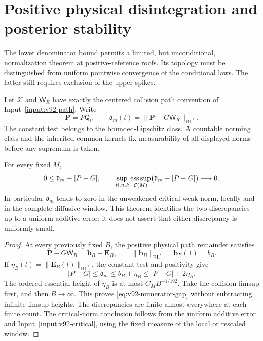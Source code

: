 \section{Positive physical disintegration and posterior stability}
\label{sec:v92-paths}
The lower denominator bound permits a limited, but unconditional,
normalization theorem at positive-reference roofs. Its topology must
be distinguished from uniform pointwise convergence of the conditional
laws. The latter still requires exclusion of the upper spikes.

Let $\mathcal X$ and $\mathsf W_R$ have exactly the centered collision
path convention of Input~\ref{input:v92-path}. Write
\[
 \mathbf P=P\mathsf Q_t,\qquad
 \mathfrak d_m(t)=\|\mathbf P-G\mathsf W_R\|_{\mathrm{BL}^*}.
\]
The constant test belongs to the bounded-Lipschitz class. A countable
norming class and the inherited common kernels fix measurability of
all displayed norms before any supremum is taken.

\begin{theorem}
\label{thm:v92-numerator}
For every fixed $M$,
\begin{equation}\label{eq:v92-numerator-gap}
 0\le\mathfrak d_m-|P-G|,\qquad
 \sup_{R,n,k}\esssup_{\mathcal C(M)}
       \bigl(\mathfrak d_m-|P-G|\bigr)\longrightarrow0.
\end{equation}
In particular $\mathfrak d_m$ tends to zero in the unweakened critical
weak norm, locally and in the complete diffusive window. This theorem
identifies the two discrepancies up to a uniform additive error; it
does not assert that either discrepancy is uniformly small.
\end{theorem}
\begin{proof}
At every previously fixed $B$, the positive physical path remainder
satisfies
\[
 \mathbf P-G\mathsf W_R=\mathbf b_B+\mathbf E_B,
 \qquad \|\mathbf b_B\|_{\mathrm{BL}^*}
       =\mathbf b_B(1)=b_B.
\]
If $\eta_B(t)=\|\mathbf E_B(t)\|_{\mathrm{BL}^*}$, the constant
test and positivity give
\[
 |P-G|\le\mathfrak d_m\le b_B+\eta_B
                                      \le |P-G|+2\eta_B.
\]
The ordered essential height of $\eta_B$ is at most $C_MB^{-1/192}$.
Take the collision limsup first, and then $B\to\infty$.
This proves \eqref{eq:v92-numerator-gap} without subtracting infinite
limsup heights. The discrepancies are finite almost everywhere at each
finite count. The critical-norm conclusion follows from the uniform
additive error and Input~\ref{input:v92-critical}, using the fixed
measure of the local or rescaled window.
\end{proof}

